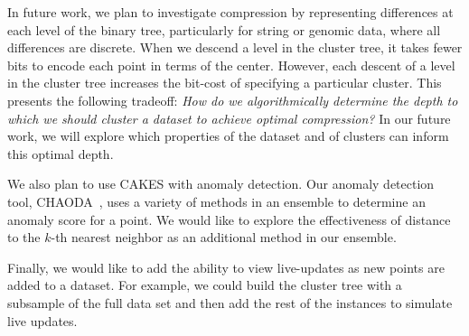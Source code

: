 In future work, we plan to investigate compression by representing differences at each level of the
binary tree, particularly for string or genomic data, where all differences are discrete.
When we descend a level in the cluster tree, it takes fewer bits to encode each point in terms of the center. 
However, each descent of a level in the cluster tree increases the bit-cost of specifying a particular cluster. 
This presents the following tradeoff: \emph{How do we algorithmically determine the depth to which we should cluster a dataset to achieve optimal compression?} 
In our future work, we will explore which properties of the dataset and of clusters can inform this optimal depth. 


We also plan to use CAKES with anomaly detection. Our anomaly detection tool, CHAODA~\cite{ishaq2021clustered}, uses 
a variety of methods in an ensemble to determine an anomaly score for a point. We would like to explore the effectiveness of 
distance to the $k$-th nearest neighbor as an additional method in our ensemble.

Finally, we would like to add the ability to view live-updates as new points are added to a dataset. For example, 
we could build the cluster tree with a subsample of the full data set and then add the rest of the instances to 
simulate live updates.

